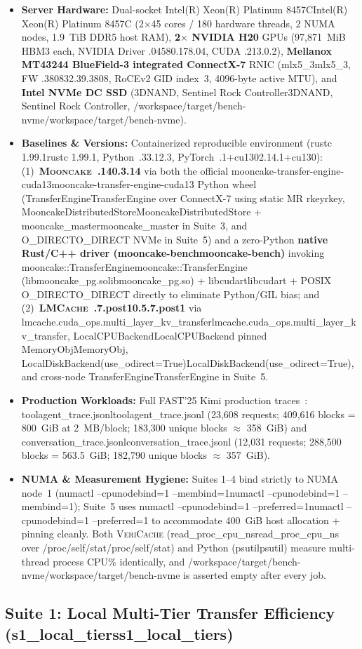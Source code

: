 \documentclass[11pt,a4paper]{article}
\let\origunderscore\_
\DeclareRobustCommand{\code}[1]{{\ttfamily\ifmmode #1\else\def\_{\origunderscore\hspace{0pt}}#1\fi}}
\newcommand{\VC}{\textsc{VeriCache}}
\newcommand{\MC}{\textsc{Mooncake}}
\newcommand{\LM}{\textsc{LMCache}}
\begin{document}
\begin{itemize}
  \item \textbf{Server Hardware:} Dual-socket \code{Intel(R) Xeon(R) Platinum 8457C} (2$\times$45 cores / 180 hardware threads, 2 NUMA nodes, 1.9~TiB DDR5 host RAM), \textbf{2$\times$ NVIDIA H20} GPUs (97,871~MiB HBM3 each, NVIDIA Driver \code{580.178.04}, CUDA \code{13.0.2}), \textbf{Mellanox MT43244 BlueField-3 integrated ConnectX-7} RNIC (\code{mlx5\_3}, FW \code{32.39.3808}, RoCEv2 GID index~\code{3}, 4096-byte active MTU), and \textbf{Intel NVMe DC SSD} (\code{3DNAND, Sentinel Rock Controller}, \code{/workspace/target/bench-nvme}).
  \item \textbf{Baselines \& Versions:} Containerized reproducible environment (\code{rustc 1.99.1}, Python~\code{3.12.3}, PyTorch~\code{2.14.1+cu130}): (1)~\textbf{\MC{}~\code{0.3.14}} via both the official \code{mooncake-transfer-engine-cuda13} Python wheel (\code{TransferEngine} over ConnectX-7 using static MR \code{rkey}, \code{MooncakeDistributedStore} + \code{mooncake\_master} in Suite~3, and \code{O\_DIRECT} NVMe in Suite~5) and a zero-Python \textbf{native Rust/C++ driver (\code{mooncake-bench})} invoking \code{mooncake::TransferEngine} (\code{libmooncake\_pg.so}) + \code{libcudart} + POSIX \code{O\_DIRECT} directly to eliminate Python/GIL bias; and (2)~\textbf{\LM{}~\code{0.5.7.post1}} via \code{lmcache.cuda\_ops.multi\_layer\_kv\_transfer}, \code{LocalCPUBackend} pinned \code{MemoryObj}, \code{LocalDiskBackend(use\_odirect=True)}, and cross-node \code{TransferEngine} in Suite~5.
  \item \textbf{Production Workloads:} Full FAST'25 Kimi production traces~\cite{mooncake}: \code{toolagent\_trace.jsonl} (23,608 requests; 409,616 blocks = 800~GiB at 2~MB/block; 183,300 unique blocks $\approx$ 358~GiB) and \code{conversation\_trace.jsonl} (12,031 requests; 288,500 blocks = 563.5~GiB; 182,790 unique blocks $\approx$ 357~GiB).
  \item \textbf{NUMA \& Measurement Hygiene:} Suites 1--4 bind strictly to NUMA node~1 (\code{numactl --cpunodebind=1 --membind=1}); Suite~5 uses \code{numactl --cpunodebind=1 --preferred=1} to accommodate 400~GiB host allocation + pinning cleanly. Both \VC{} (\code{read\_proc\_cpu\_ns} over \code{/proc/self/stat}) and Python (\code{psutil}) measure multi-thread process CPU\% identically, and \code{/workspace/target/bench-nvme} is asserted empty after every job.
\end{itemize}

\subsection{Suite 1: Local Multi-Tier Transfer Efficiency (\code{s1\_local\_tiers})}
\end{document}
